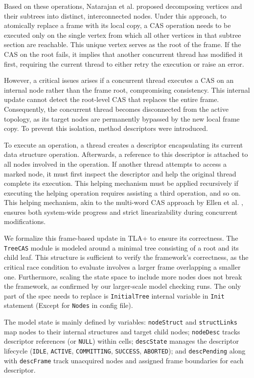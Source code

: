 Based on these operations, Natarajan et al. \cite{WaitFreeBST} proposed decomposing vertices and their subtrees into distinct, interconnected nodes. Under this approach, to atomically replace a frame with its local copy, a CAS operation needs to be executed only on the single vertex from which all other vertices in that subtree section are reachable. This unique vertex serves as the root of the frame. If the CAS on the root fails, it implies that another concurrent thread has modified it first, requiring the current thread to either retry the execution or raise an error.

However, a critical issues arises if a concurrent thread executes a CAS on an internal node rather than the frame root, compromising consistency. This internal update cannot detect the root-level CAS that replaces the entire frame. Consequently, the concurrent thread becomes disconnected from the active topology, as its target nodes are permanently bypassed by the new local frame copy. To prevent this isolation, method descriptors were introduced.

To execute an operation, a thread creates a descriptor encapsulating its current data structure operation. Afterwards, a reference to this descriptor is attached to all nodes involved in the operation. If another thread attempts to access a marked node, it must first inspect the descriptor and help the original thread complete its execution. This helping mechanism must be applied recursively if executing the helping operation requires assisting a third operation, and so on. This helping mechanism, akin to the multi-word CAS approach by Ellen et al. \cite{NonBlockBST}, ensures both system-wide progress and strict linearizability \cite{Linearizability} during concurrent modifications.

We formalize this frame-based update in TLA+ to ensure its correctness. The \texttt{TreeCAS} module is modeled around a minimal tree consisting of a root and its child leaf. This structure is sufficient to verify the framework's correctness, as the critical race condition to evaluate involves a larger frame overlapping a smaller one. Furthermore, scaling the state space to include more nodes does not break the framework, as confirmed by our larger-scale model checking runs. The only part of the spec needs to replace is \texttt{InitialTree} internal variable in \texttt{Init} statement (Except for \texttt{Nodes} in config file).

The model state is mainly defined by variables: \texttt{nodeStruct} and \texttt{structLinks} map nodes to their internal structures and target child nodes; \texttt{nodeDesc} tracks descriptor references (or \texttt{NULL}) within cells; \texttt{descState} manages the descriptor lifecycle (\texttt{IDLE}, \texttt{ACTIVE}, \texttt{COMMITTING}, \texttt{SUCCESS}, \texttt{ABORTED}); and \texttt{descPending} along with \texttt{descFrame} track unacquired nodes and assigned frame boundaries for each descriptor.

